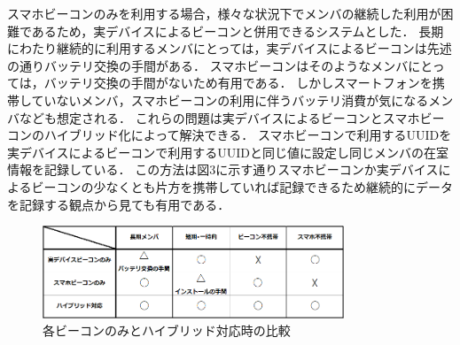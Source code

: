 スマホビーコンのみを利用する場合，様々な状況下でメンバの継続した利用が困難であるため，実デバイスによるビーコンと併用できるシステムとした．
長期にわたり継続的に利用するメンバにとっては，実デバイスによるビーコンは先述の通りバッテリ交換の手間がある．
スマホビーコンはそのようなメンバにとっては，バッテリ交換の手間がないため有用である．
しかしスマートフォンを携帯していないメンバ，スマホビーコンの利用に伴うバッテリ消費が気になるメンバなども想定される．
これらの問題は実デバイスによるビーコンとスマホビーコンのハイブリッド化によって解決できる．
スマホビーコンで利用するUUIDを実デバイスによるビーコンで利用するUUIDと同じ値に設定し同じメンバの在室情報を記録している．
この方法は図3に示す通りスマホビーコンか実デバイスによるビーコンの少なくとも片方を携帯していれば記録できるため継続的にデータを記録する観点から見ても有用である．
\begin{figure}[tbh]
  \centering
  \includegraphics[width=9cm]{image/table.png}
  \caption{各ビーコンのみとハイブリッド対応時の比較}
  \label{multipleBPM}
\end{figure}








